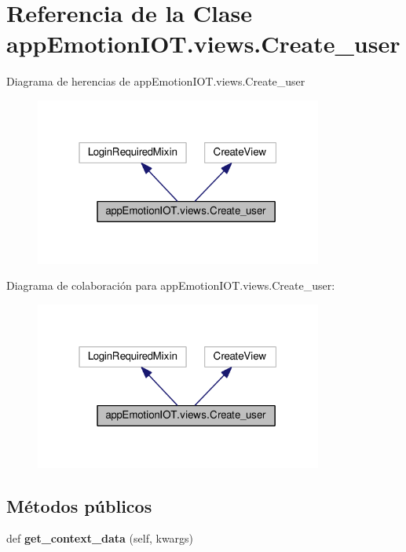 \hypertarget{classappEmotionIOT_1_1views_1_1Create__user}{}\section{Referencia de la Clase app\+Emotion\+I\+O\+T.\+views.\+Create\+\_\+user}
\label{classappEmotionIOT_1_1views_1_1Create__user}


Diagrama de herencias de app\+Emotion\+I\+O\+T.\+views.\+Create\+\_\+user
\nopagebreak
\begin{figure}[H]
\begin{center}
\leavevmode
\includegraphics[width=268pt]{classappEmotionIOT_1_1views_1_1Create__user__inherit__graph}
\end{center}
\end{figure}


Diagrama de colaboración para app\+Emotion\+I\+O\+T.\+views.\+Create\+\_\+user\+:
\nopagebreak
\begin{figure}[H]
\begin{center}
\leavevmode
\includegraphics[width=268pt]{classappEmotionIOT_1_1views_1_1Create__user__coll__graph}
\end{center}
\end{figure}
\subsection*{Métodos públicos}
\begin{DoxyCompactItemize}
\item 
def {\bfseries get\+\_\+context\+\_\+data} (self, kwargs)\hypertarget{classappEmotionIOT_1_1views_1_1Create__user_a2aac5f715c2fdcbe7d284b368508ccad}{}\label{classappEmotionIOT_1_1views_1_1Create__user_a2aac5f715c2fdcbe7d284b368508ccad}

\end{DoxyCompactItemize}
